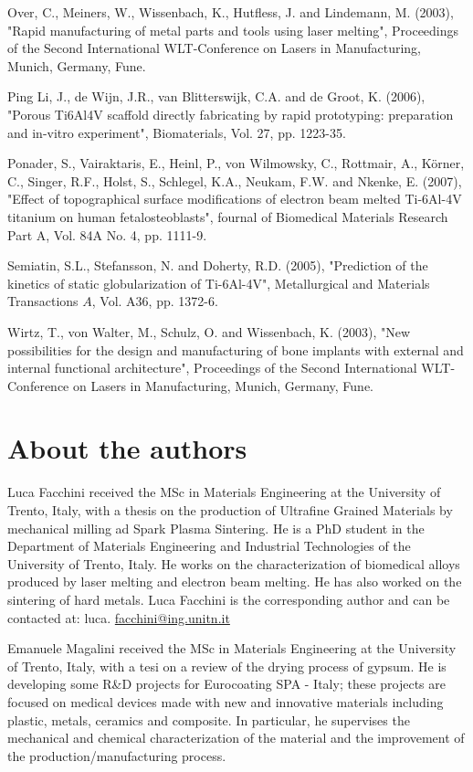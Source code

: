 \documentclass[10pt]{article}
\begin{document}
Over, C., Meiners, W., Wissenbach, K., Hutfless, J. and Lindemann, M. (2003), "Rapid manufacturing of metal parts and tools using laser melting", Proceedings of the Second International WLT-Conference on Lasers in Manufacturing, Munich, Germany, Fune.

Ping Li, J., de Wijn, J.R., van Blitterswijk, C.A. and de Groot, K. (2006), "Porous Ti6Al4V scaffold directly fabricating by rapid prototyping: preparation and in-vitro experiment", Biomaterials, Vol. 27, pp. 1223-35.

Ponader, S., Vairaktaris, E., Heinl, P., von Wilmowsky, C., Rottmair, A., Körner, C., Singer, R.F., Holst, S., Schlegel, K.A., Neukam, F.W. and Nkenke, E. (2007), "Effect of topographical surface modifications of electron beam melted Ti-6Al-4V titanium on human fetalosteoblasts", fournal of Biomedical Materials Research Part A, Vol. 84A No. 4, pp. 1111-9.

Semiatin, S.L., Stefansson, N. and Doherty, R.D. (2005), "Prediction of the kinetics of static globularization of Ti-6Al-4V", Metallurgical and Materials Transactions $A$, Vol. A36, pp. 1372-6.

Wirtz, T., von Walter, M., Schulz, O. and Wissenbach, K. (2003), "New possibilities for the design and manufacturing of bone implants with external and internal functional architecture", Proceedings of the Second International WLT-Conference on Lasers in Manufacturing, Munich, Germany, Fune.

\section*{About the authors}
Luca Facchini received the MSc in Materials Engineering at the University of Trento, Italy, with a thesis on the production of Ultrafine Grained Materials by mechanical milling ad Spark Plasma Sintering. He is a PhD student in the Department of Materials Engineering and Industrial Technologies of the University of Trento, Italy. He works on the characterization of biomedical alloys produced by laser melting and electron beam melting. He has also worked on the sintering of hard metals. Luca Facchini is the corresponding author and can be contacted at: luca. \href{mailto:facchini@ing.unitn.it}{facchini@ing.unitn.it}

Emanuele Magalini received the MSc in Materials Engineering at the University of Trento, Italy, with a tesi on a review of the drying process of gypsum. He is developing some R\&D projects for Eurocoating SPA - Italy; these projects are focused on medical devices made with new and innovative materials including plastic, metals, ceramics and composite. In particular, he supervises the mechanical and chemical characterization of the material and the improvement of the production/manufacturing process.
\end{document}
